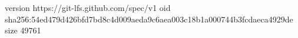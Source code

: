 version https://git-lfs.github.com/spec/v1
oid sha256:54ed479d426bfd7bd8c4d009aeda9c6aea003c18b1a000744b3fcdaeca4929de
size 49761
